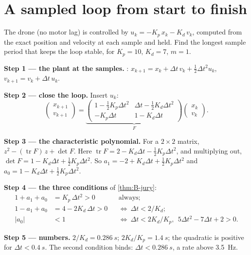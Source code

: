 \section{A sampled loop from start to finish}

\begin{example}
\label{ex:D-loop}
The drone (no motor lag) is controlled by $u_k = -K_p\,x_k - K_d\,v_k$, computed from the exact position and velocity at each sample and held. Find the longest sample period that keeps the loop stable, for $K_p = 10$, $K_d = 7$, $m = 1$.

\textbf{Step 1 — the plant at the samples.} : $x_{k+1} = x_k + \Delta t\,v_k + \tfrac12\Delta t^2u_k$, $v_{k+1} = v_k + \Delta t\,u_k$.

\textbf{Step 2 — close the loop.} Insert $u_k$:
\begin{equation*}
  \begin{pmatrix}x_{k+1}\\ v_{k+1}\end{pmatrix} = \underbrace{\begin{pmatrix}1 - \tfrac12K_p\Delta t^2 & \Delta t - \tfrac12K_d\Delta t^2\\ -K_p\Delta t & 1 - K_d\Delta t\end{pmatrix}}_{F}\begin{pmatrix}x_k\\ v_k\end{pmatrix} .
\end{equation*}

\textbf{Step 3 — the characteristic polynomial.} For a $2 \times 2$ matrix, $z^2 - (\operatorname{tr}F)\,z + \det F$. Here $\operatorname{tr}F = 2 - K_d\Delta t - \tfrac12K_p\Delta t^2$, and multiplying out, $\det F = 1 - K_d\Delta t + \tfrac12K_p\Delta t^2$. So $a_1 = -2 + K_d\Delta t + \tfrac12K_p\Delta t^2$ and $a_0 = 1 - K_d\Delta t + \tfrac12K_p\Delta t^2$.

\textbf{Step 4 — the three conditions} of \cref{thm:B-jury}:
\begin{align*}
  1 + a_1 + a_0 &= K_p\,\Delta t^2 > 0 && \text{always;}\\
  1 - a_1 + a_0 &= 4 - 2K_d\,\Delta t > 0 && \Longleftrightarrow\ \Delta t < 2/K_d ;\\
  |a_0| &< 1 && \Longleftrightarrow\ \Delta t < 2K_d/K_p ,\ \ 5\Delta t^2 - 7\Delta t + 2 > 0 .
\end{align*}

\textbf{Step 5 — numbers.} $2/K_d = \SI{0.286}{s}$; $2K_d/K_p = \SI{1.4}{s}$; the quadratic is positive for $\Delta t < \SI{0.4}{s}$. The second condition binds: $\Delta t < \SI{0.286}{s}$, a rate above \SI{3.5}{Hz}.


\end{example}
